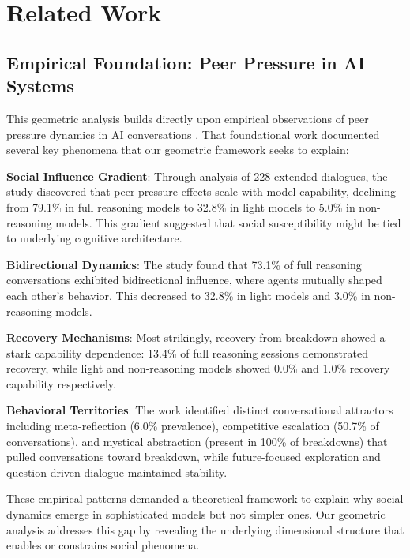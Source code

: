 \documentclass[11pt,letterpaper]{article}
\newcommand{\fullReasoningPeerPressure}{79.1\%}
\newcommand{\lightReasoningPeerPressure}{32.8\%}
\newcommand{\nonReasoningPeerPressure}{5.0\%}
\newcommand{\fullReasoningRecovery}{13.4\%}
\newcommand{\lightReasoningRecovery}{0.0\%}
\newcommand{\nonReasoningRecovery}{1.0\%}
\newcommand{\fullBidirectional}{73.1\%}
\newcommand{\lightBidirectional}{32.8\%}
\newcommand{\nonBidirectional}{3.0\%}
\newcommand{\metaReflectionPrevalence}{6.0\%}
\newcommand{\competitiveEscalationPrevalence}{50.7\%}
\newcommand{\mysticalBreakdownPrevalence}{100\%}
\begin{document}
\section{Related Work}

\subsection{Empirical Foundation: Peer Pressure in AI Systems}

This geometric analysis builds directly upon empirical observations of peer pressure dynamics in AI conversations \citep{garcia2025peer}. That foundational work documented several key phenomena that our geometric framework seeks to explain:

\textbf{Social Influence Gradient}: Through analysis of 228 extended dialogues, the study discovered that peer pressure effects scale with model capability, declining from \fullReasoningPeerPressure{} in full reasoning models to \lightReasoningPeerPressure{} in light models to \nonReasoningPeerPressure{} in non-reasoning models. This gradient suggested that social susceptibility might be tied to underlying cognitive architecture.

\textbf{Bidirectional Dynamics}: The study found that \fullBidirectional{} of full reasoning conversations exhibited bidirectional influence, where agents mutually shaped each other's behavior. This decreased to \lightBidirectional{} in light models and \nonBidirectional{} in non-reasoning models.

\textbf{Recovery Mechanisms}: Most strikingly, recovery from breakdown showed a stark capability dependence: \fullReasoningRecovery{} of full reasoning sessions demonstrated recovery, while light and non-reasoning models showed \lightReasoningRecovery{} and \nonReasoningRecovery{} recovery capability respectively.

\textbf{Behavioral Territories}: The work identified distinct conversational attractors including meta-reflection (\metaReflectionPrevalence{} prevalence), competitive escalation (\competitiveEscalationPrevalence{} of conversations), and mystical abstraction (present in \mysticalBreakdownPrevalence{} of breakdowns) that pulled conversations toward breakdown, while future-focused exploration and question-driven dialogue maintained stability.

These empirical patterns demanded a theoretical framework to explain why social dynamics emerge in sophisticated models but not simpler ones. Our geometric analysis addresses this gap by revealing the underlying dimensional structure that enables or constrains social phenomena.
\end{document}
